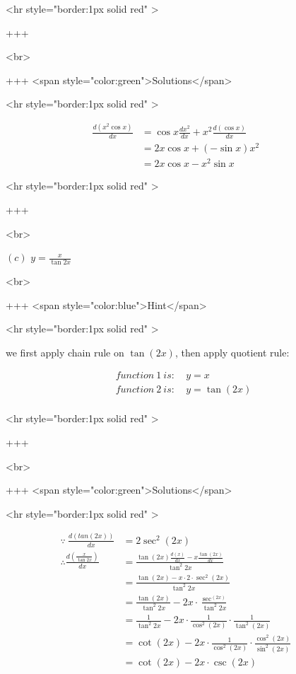 <hr style="border:1px solid red" >

+++

<br>

+++ <span style="color:green">Solutions</span>

<hr style="border:1px solid red" >

\begin{equation}
\begin{aligned}
\frac{d(x^2\cos x)}{dx} &=\cos x \frac{dx^2}{dx} + x^2\frac{d(\cos x)}{dx} \\
&=2 x \cos x + (-\sin x) x^2 \\
&=2 x\cos x - x^2 \sin x&&
\end{aligned}
\end{equation}

<hr style="border:1px solid red" >

+++

<br>

\((c)\) $y=\frac{x}{\tan 2 x}$


<br>

+++ <span style="color:blue">Hint</span>

<hr style="border:1px solid red" >

we first apply chain rule on $\tan (2x)$, then apply quotient rule:

\begin{equation}
\begin{aligned}
function\ 1\ is:\ &y=x \\
function\ 2\ is:\ &y=\tan (2x) \\
\end{aligned}
\end{equation}

<hr style="border:1px solid red" >

+++

<br>

+++ <span style="color:green">Solutions</span>

<hr style="border:1px solid red" >

\begin{equation}
\begin{aligned}
\because\ \frac{d(tan(2x))}{dx} &=2\sec^{2} (2x) \\
\therefore \frac{  d(\frac{x}{\tan 2x})  }{dx} &= \frac{\tan(2x)\frac{d(x)}{dx}-x\frac{\tan(2x)}{dx}}{\tan ^{2} 2x} \\
&= \frac{\tan(2x) - x\cdot2\cdot\sec^{2}(2x)}{\tan ^{2} 2x} \\
&= \frac{\tan(2x)}{\tan^{2}2x}-2x\cdot\frac{\sec^(2x)}{{\tan ^{2} 2x}}\\
&= \frac{1}{\tan ^{2} 2x} - 2x\cdot\frac{1}{\cos^{2}(2x)}\cdot\frac{1}{\tan ^{2} (2x)}\\
&= \cot(2x)-2x\cdot\frac{1}{\cos^{2}(2x)}\cdot\frac{\cos^{2}(2x)}{\sin^{2}(2x)}\\
&= \cot(2x)-2x\cdot\csc(2x)&&
\end{aligned}
\end{equation}

